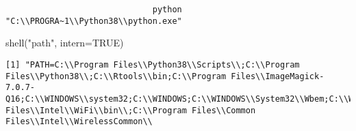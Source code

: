 \documentclass[
]{book}
\newenvironment{Shaded}{\begin{snugshade}}{\end{snugshade}}
\newcommand{\AttributeTok}[1]{\textcolor[rgb]{0.77,0.63,0.00}{#1}}
\newcommand{\ConstantTok}[1]{\textcolor[rgb]{0.00,0.00,0.00}{#1}}
\newcommand{\FunctionTok}[1]{\textcolor[rgb]{0.00,0.00,0.00}{#1}}
\newcommand{\NormalTok}[1]{#1}
\newcommand{\StringTok}[1]{\textcolor[rgb]{0.31,0.60,0.02}{#1}}
\begin{document}
\begin{verbatim}
                              python 
"C:\\PROGRA~1\\Python38\\python.exe" 
\end{verbatim}

\begin{Shaded}
\begin{Highlighting}[]
\FunctionTok{shell}\NormalTok{(}\StringTok{"path"}\NormalTok{, }\AttributeTok{intern=}\ConstantTok{TRUE}\NormalTok{)}
\end{Highlighting}
\end{Shaded}

\begin{verbatim}
[1] "PATH=C:\\Program Files\\Python38\\Scripts\\;C:\\Program Files\\Python38\\;C:\\Rtools\\bin;C:\\Program Files\\ImageMagick-7.0.7-Q16;C:\\WINDOWS\\system32;C:\\WINDOWS;C:\\WINDOWS\\System32\\Wbem;C:\\WINDOWS\\System32\\WindowsPowerShell\\v1.0\\;C:\\Program Files\\Intel\\WiFi\\bin\\;C:\\Program Files\\Common Files\\Intel\\WirelessCommon\\
\end{verbatim}
\end{document}
